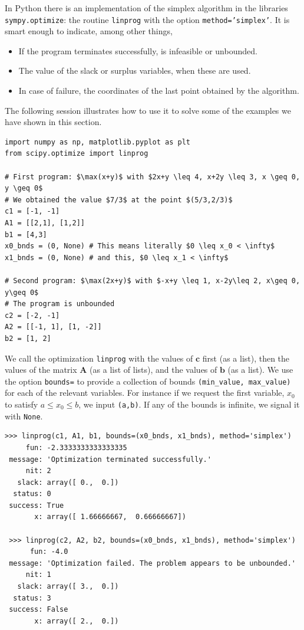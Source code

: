 \begin{example}
In Python there is an implementation of the simplex algorithm in the libraries \texttt{sympy.optimize}: the routine \texttt{linprog} with the option \texttt{method='simplex'}.  It is smart enough to indicate, among other things,
\begin{itemize}
	\item If the program terminates successfully, is infeasible or unbounded.
	\item The value of the slack or surplus variables, when these are used.
	\item In case of failure, the coordinates of the last point obtained by the algorithm.
\end{itemize} 
The following session illustrates how to use it to solve some of the examples we have shown in this section.

\begin{verbatim}
import numpy as np, matplotlib.pyplot as plt 
from scipy.optimize import linprog

# First program: $\max(x+y)$ with $2x+y \leq 4, x+2y \leq 3, x \geq 0, y \geq 0$
# We obtained the value $7/3$ at the point $(5/3,2/3)$
c1 = [-1, -1]
A1 = [[2,1], [1,2]]
b1 = [4,3]
x0_bnds = (0, None) # This means literally $0 \leq x_0 < \infty$
x1_bnds = (0, None) # and this, $0 \leq x_1 < \infty$

# Second program: $\max(2x+y)$ with $-x+y \leq 1, x-2y\leq 2, x\geq 0, y\geq 0$
# The program is unbounded
c2 = [-2, -1]
A2 = [[-1, 1], [1, -2]]
b2 = [1, 2]
\end{verbatim}

We call the optimization \texttt{linprog} with the values of $\boldsymbol{c}$ first (as a list), then the values of the matrix $\boldsymbol{A}$ (as a list of lists), and the values of $\boldsymbol{b}$ (as a list).  We use the option \texttt{bounds=} to provide a collection of bounds \texttt{(min\_value, max\_value)} for each of the relevant variables.  For instance if we request the first variable, $x_0$ to satisfy $a \leq x_0 \leq b$, we input \texttt{(a,b)}.  If any of the bounds is infinite, we signal it with \texttt{None}.

\begin{verbatim}
>>> linprog(c1, A1, b1, bounds=(x0_bnds, x1_bnds), method='simplex')
     fun: -2.3333333333333335
 message: 'Optimization terminated successfully.'
     nit: 2
   slack: array([ 0.,  0.])
  status: 0
 success: True
       x: array([ 1.66666667,  0.66666667])

 >>> linprog(c2, A2, b2, bounds=(x0_bnds, x1_bnds), method='simplex')
      fun: -4.0
 message: 'Optimization failed. The problem appears to be unbounded.'
     nit: 1
   slack: array([ 3.,  0.])
  status: 3
 success: False
       x: array([ 2.,  0.])

\end{verbatim}
\end{example}